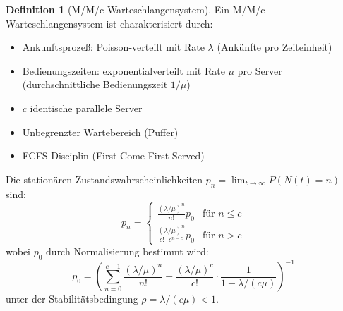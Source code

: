 \documentclass[a4paper,11pt]{article}
\theoremstyle{definition}
\newtheorem{definition}{Definition}
\begin{document}
\begin{definition}[M/M/c Warteschlangensystem]
    \label{def:mmn}
    Ein M/M/c-Warteschlangensystem ist charakterisiert durch:
    \begin{itemize}
        \item Ankunftsprozeß: Poisson-verteilt mit Rate $\lambda$ (Ankünfte pro Zeiteinheit)
        \item Bedienungszeiten: exponentialverteilt mit Rate $\mu$ pro Server 
              (durchschnittliche Bedienungszeit $1/\mu$)
        \item $c$ identische parallele Server
        \item Unbegrenzter Wartebereich (Puffer)
        \item FCFS-Disciplin (First Come First Served)
    \end{itemize}

    Die stationären Zustandswahrscheinlichkeiten $p_n = \lim_{t \to \infty} P(N(t) = n)$ sind:
    \[
        p_n = \begin{cases}
            \frac{(\lambda/\mu)^n}{n!} p_0 & \text{für } n \leq c \\
            \frac{(\lambda/\mu)^n}{c! \cdot c^{n-c}} p_0 & \text{für } n > c
        \end{cases}
    \]
    wobei $p_0$ durch Normalisierung bestimmt wird:
    \[
        p_0 = \left( \sum_{n=0}^{c-1} \frac{(\lambda/\mu)^n}{n!} + \frac{(\lambda/\mu)^c}{c!} \cdot 
               \frac{1}{1 - \lambda/(c\mu)} \right)^{-1}
    \]
    unter der Stabilitätsbedingung $\rho = \lambda/(c\mu) < 1$.
\end{definition}
\end{document}
